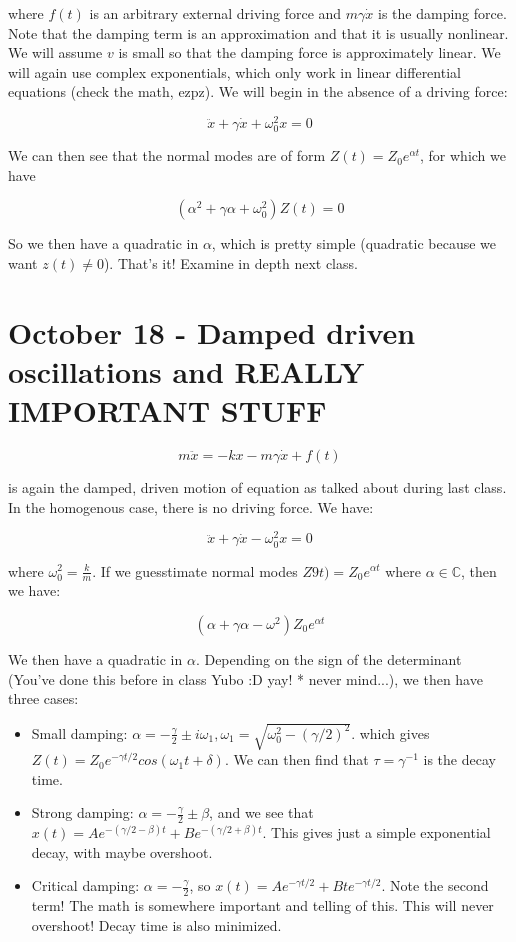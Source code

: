 \documentclass{report}
\begin{document}
where $f(t)$ is an arbitrary external driving force and $m \gamma \dot{x}$ is the damping force. Note that the damping term is an approximation and that it is usually nonlinear. We will assume $v$ is small so that the damping force is approximately linear. We will again use complex exponentials, which only work in linear differential equations (check the math, ezpz). We will begin in the absence of a driving force:

$$\ddot{x} + \gamma \dot{x} + \omega_0^2x = 0$$

We can then see that the normal modes are of form $Z(t) = Z_0 e^{\alpha t}$, for which we have

$$(\alpha^2 + \gamma\alpha + \omega_0^2)Z(t) = 0$$

So we then have a quadratic in $\alpha$, which is pretty simple (quadratic because we want $z(t) \neq 0$). That's it! Examine in depth next class.

\chapter{October 18 - Damped driven oscillations and \textbf{REALLY IMPORTANT STUFF}}

$$m\ddot{x} = -kx - m\gamma\dot{x} + f(t)$$

is again the damped, driven motion of equation as talked about during last class. In the homogenous case, there is no driving force. We have:

$$\ddot{x} + \gamma \dot{x} - \omega_0^2x = 0$$

where $\omega_0^2 = \frac{k}{m}$. If we guesstimate normal modes $Z9t) = Z_0e^{\alpha t}$ where $\alpha \in \mathbb{C}$, then we have:

$$(\alpha + \gamma\alpha -\omega^2)Z_0e^{\alpha t}$$

We then have a quadratic in $\alpha$. Depending on the sign of the determinant (You've done this before in class Yubo :D yay! * never mind...), we then have three cases:

\begin{itemize}
\item Small damping: $\alpha = -\frac{\gamma}{2} \pm i\omega_1, \omega_1 = \sqrt{\omega_0^2 - (\gamma/2)^2}$. which gives $Z(t) = Z_0e^{-\gamma t/2}cos(\omega_1t + \delta)$. We can then find that $\tau = \gamma^{-1}$ is the decay time.
\item Strong damping: $\alpha = -\frac{\gamma}{2} \pm \beta$, and we see that $x(t) = Ae^{-(\gamma/2 - \beta)t} + Be^{-(\gamma/2 + \beta)t}$. This gives just a simple exponential decay, with maybe overshoot. 
\item Critical damping: $\alpha = -\frac{\gamma}{2}$, so $x(t) = Ae^{-\gamma t/2} + Bte^{-\gamma t/2}$. Note the second term! The math is somewhere important and telling of this. This will never overshoot! Decay time is also minimized. 
\end{itemize}
\end{document}
